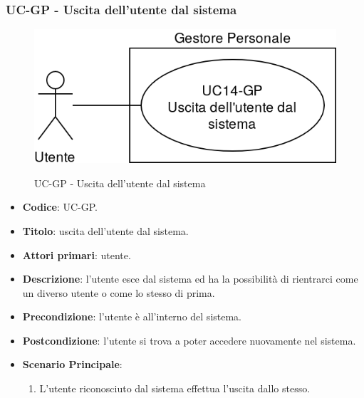 \subsubsection{UC\theuccount-GP - Uscita dell'utente dal sistema}
		\begin{figure}[H]
			\centering
				\includegraphics[width=0.7\columnwidth]{img/casi_d'uso/UC14.png}\\
			\caption{UC\theuccount-GP - Uscita dell'utente dal sistema}
		\end{figure}
	\begin{itemize}
		\item \textbf{Codice}: UC\theuccount-GP.
		\item \textbf{Titolo}: uscita dell'utente dal sistema.
		\item \textbf{Attori primari}: utente.
		\item \textbf{Descrizione}: l'utente esce dal sistema ed ha la possibilità di rientrarci come	un diverso utente o come lo stesso di prima.
		\item \textbf{Precondizione}: l'utente è all'interno del sistema.
		\item \textbf{Postcondizione}: l'utente si trova a poter accedere nuovamente nel sistema.
		\item \textbf{Scenario Principale}:
		\begin{enumerate}
			\item L'utente riconosciuto dal sistema effettua l'uscita dallo stesso.
		\end{enumerate}
	\end{itemize}